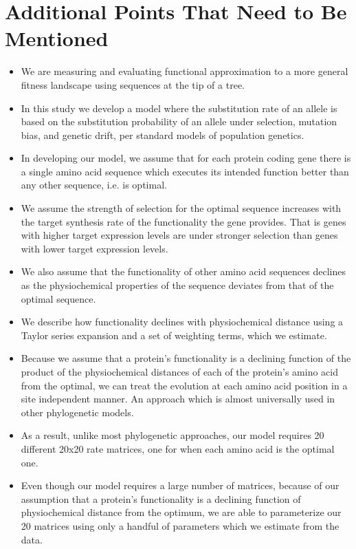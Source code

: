 \documentclass{article}
\begin{document}
\section*{Additional Points That Need to Be Mentioned}
\begin{itemize}
\item We are measuring and evaluating functional approximation to a more general fitness landscape using sequences at the tip of a tree.
\item In this study we develop a model where the substitution rate of an allele is based on the substitution probability of an allele under selection, mutation bias, and genetic drift, per standard models of population genetics.
\item In developing our model, we assume that for each protein coding gene there is a single amino acid sequence which executes its intended function better than any other sequence, i.e. is optimal.
\item We assume the strength of selection for the optimal sequence increases with the target synthesis rate of the functionality the gene provides.
That is genes with higher target expression levels are under stronger selection than genes with lower target expression levels.
\item We also assume that the functionality of other amino acid sequences declines as the physiochemical properties of the sequence deviates from that of the optimal sequence.
\item We describe how functionality  declines with physiochemical distance using a Taylor series expansion and a set of weighting terms, which we estimate.
\item Because we assume that a protein's functionality is a declining function of the product of the physiochemical distances of each of the protein's amino acid from the optimal, we can treat the evolution at each amino acid position in a site independent manner. 
An approach which is almost universally used in other phylogenetic models.
\item As a result, unlike most phylogenetic approaches, our model requires 20 different 20x20 rate matrices, one for when each amino acid is the optimal one.
\item Even though our model requires a large number of matrices, because of our assumption that a protein's functionality is a declining function of physiochemical distance from the optimum, we are able to parameterize our 20 matrices using only a handful of parameters which we estimate from the data.

\end{itemize}
\end{document}
